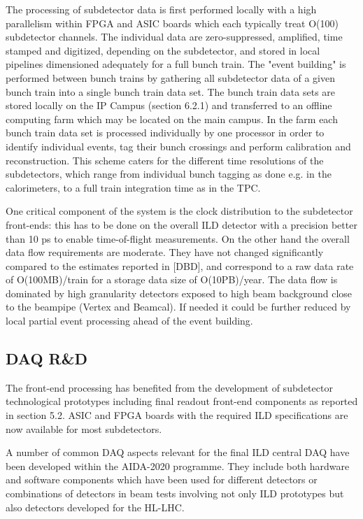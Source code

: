 The processing of subdetector data is first performed locally with a high parallelism within FPGA and ASIC boards which each typically treat O(100) subdetector channels. The individual data are zero-suppressed, amplified, time stamped and digitized, depending on the subdetector, and stored in local pipelines dimensioned adequately for a full bunch train. The "event building" is performed between bunch trains by gathering all subdetector data of a given bunch train into a single bunch train data set. The bunch train data sets are stored locally on the IP Campus (section 6.2.1) and transferred to an offline computing farm which may be located on the main campus. In the farm each bunch train data set is processed individually by one processor in order to identify individual events, tag their bunch crossings and perform calibration and reconstruction. This scheme caters for the different time resolutions of the subdetectors, which range from individual bunch tagging as done e.g. in the calorimeters, to a full train integration time as in the TPC.

One critical component of the system is the clock distribution to the subdetector front-ends: this has to be done on the overall ILD detector with a precision better than 10 ps to enable time-of-flight measurements. On the other hand the overall data flow requirements are moderate. They have not changed significantly compared to the estimates reported in [DBD], and correspond to a raw data rate of O(100MB)/train for a storage data size of O(10PB)/year. The data flow is dominated by high granularity detectors exposed to high beam background close to the beampipe (Vertex and Beamcal). If needed it could be further reduced by local partial event processing ahead of the event building.

\subsection{DAQ R\&D}

The front-end processing has benefited from the development of subdetector technological prototypes including final readout front-end components as reported in section 5.2. ASIC and FPGA boards with the required ILD specifications are now available for most subdetectors.

A number of common DAQ aspects relevant for the final ILD central DAQ have been developed \cite{ild:bib:AIDADAQ} within the AIDA-2020 programme. They include both hardware and software components which have been used for different detectors or combinations of detectors in beam tests involving not only ILD prototypes but also detectors developed for the HL-LHC. 


